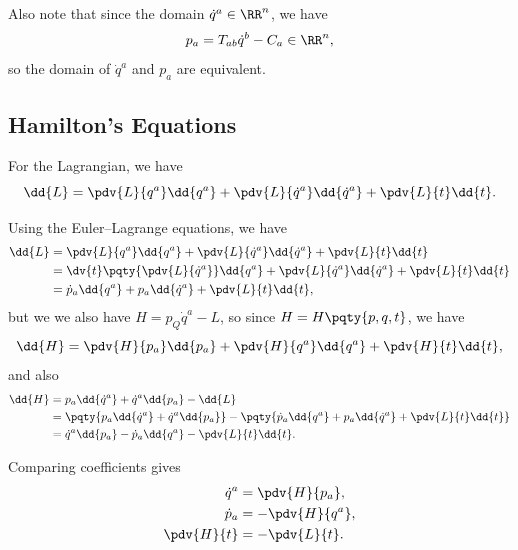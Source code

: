 Also note that since the domain \(\dot{q}^a \in \RR^n\), we have 
\begin{equation}
    p_a = T_{ab} \dot{q}^b - C_a \in \RR^n,
\end{equation}
so the domain of \(\dot{q}^a\) and \(p_a\) are equivalent.

\subsection{Hamilton's Equations}

For the Lagrangian, we have
\begin{equation}
    \dd{L} = \pdv{L}{q^a} \dd{q^a} + \pdv{L}{\dot{q}^a} \dd{\dot{q}^a} + \pdv{L}{t} \dd{t}.
\end{equation}

Using the Euler--Lagrange equations, we have
\begin{subequations}
    \begin{align}
        \dd{L} &= \pdv{L}{q^a} \dd{q^a} + \pdv{L}{\dot{q}^a} \dd{\dot{q}^a} + \pdv{L}{t} \dd{t} \\
        &= \dv{t} \pqty{\pdv{L}{\dot{q}^a}} \dd{q^a} + \pdv{L}{\dot{q}^a} \dd{\dot{q}^a} + \pdv{L}{t} \dd{t} \\
        &= \dot{p}_a \dd{q^a} + p_a \dd{\dot{q}^a} + \pdv{L}{t} \dd{t},
    \end{align}
\end{subequations}
but we we also have \(H = p_Q \dot{q}^a - L\), so since \(H = H\pqty{p, q, t}\), we have
\begin{equation}
    \dd{H} = \pdv{H}{p_a} \dd{p_a} + \pdv{H}{q^a} \dd{q^a} + \pdv{H}{t} \dd{t},
\end{equation}
and also
\begin{subequations}
    \begin{align}
        \dd{H} &= p_a \dd{\dot{q}^a} + \dot{q}^a \dd{p_a} - \dd{L} \\
        &= \pqty{p_a \dd{\dot{q}^a} + \dot{q}^a \dd{p_a}} - \pqty{\dot{p}_a \dd{q^a} + p_a \dd{\dot{q}^a} + \pdv{L}{t} \dd{t}} \\
        &= \dot{q}^a \dd{p_a} - \dot{p}_a \dd{q^a} - \pdv{L}{t} \dd{t}.
    \end{align}
\end{subequations}

Comparing coefficients gives 
\begin{subequations}
    \begin{align}
        \dot{q}^a &= \pdv{H}{p_a}, \\
        \dot{p}_a &= -\pdv{H}{q^a}, \\
        \pdv{H}{t} &= -\pdv{L}{t}.
    \end{align}
\end{subequations}

